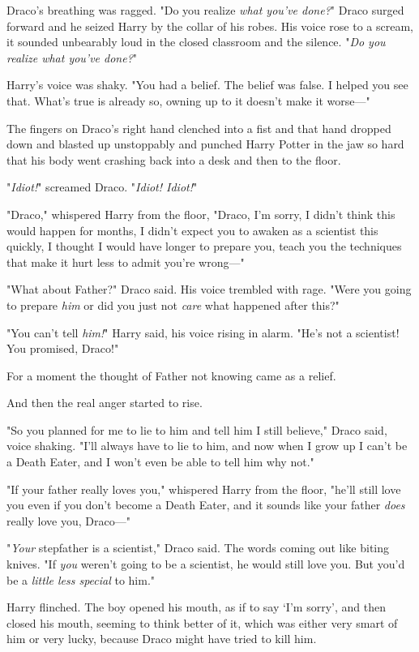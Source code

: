 Draco's breathing was ragged. "Do you realize \emph{what you've done?}" Draco 
surged forward and he seized Harry by the collar of his robes. His voice rose 
to a scream, it sounded unbearably loud in the closed classroom and the 
silence. "\emph{Do you realize what you've done?}"

Harry's voice was shaky. "You had a belief. The belief was false. I helped you 
see that. What's true is already so, owning up to it doesn't make it worse---"

The fingers on Draco's right hand clenched into a fist and that hand dropped 
down and blasted up unstoppably and punched Harry Potter in the jaw so hard 
that his body went crashing back into a desk and then to the floor.

"\emph{Idiot!}" screamed Draco. "\emph{Idiot! Idiot!}"

"Draco," whispered Harry from the floor, "Draco, I'm sorry, I didn't think this 
would happen for months, I didn't expect you to awaken as a scientist this 
quickly, I thought I would have longer to prepare you, teach you the techniques 
that make it hurt less to admit you're wrong---"

"What about Father?" Draco said. His voice trembled with rage. "Were you going 
to prepare \emph{him} or did you just not \emph{care} what happened after this?"

"You can't tell \emph{him!}" Harry said, his voice rising in alarm. "He's not a 
scientist! You promised, Draco!"

For a moment the thought of Father not knowing came as a relief.

And then the real anger started to rise.

"So you planned for me to lie to him and tell him I still believe," Draco said, 
voice shaking. "I'll always have to lie to him, and now when I grow up I can't 
be a Death Eater, and I won't even be able to tell him why not."

"If your father really loves you," whispered Harry from the floor, "he'll still 
love you even if you don't become a Death Eater, and it sounds like your father 
\emph{does} really love you, Draco---"

"\emph{Your} stepfather is a scientist," Draco said. The words coming out like 
biting knives. "If \emph{you} weren't going to be a scientist, he would still 
love you. But you'd be a \emph{little less special} to him."

Harry flinched. The boy opened his mouth, as if to say `I'm sorry', and then 
closed his mouth, seeming to think better of it, which was either very smart of 
him or very lucky, because Draco might have tried to kill him.


